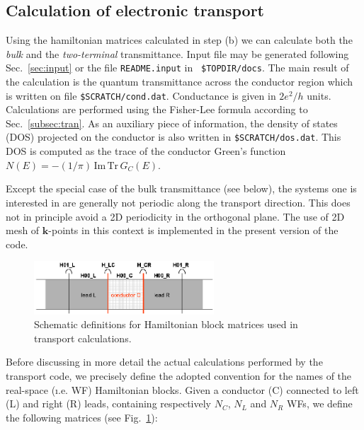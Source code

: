 
\subsection {Calculation of electronic transport}
\label{subsection:transport}

Using the hamiltonian matrices calculated in step (b) we can
calculate both the {\em bulk} and the {\em two-terminal}
transmittance. Input file may be generated following
Sec.~\ref{sec:input} or the file {\tt README.input} in {\tt
\$TOPDIR/docs}. The main result of the calculation is the quantum
transmittance across the conductor region which is written on file
{\tt \$SCRATCH/cond.dat}. Conductance is given in $2e^2/h$ units.
Calculations are performed using the Fisher-Lee formula according
to Sec.~\ref{subsec:tran}. As an auxiliary piece of information,
the density of states (DOS) projected on the conductor is also
written in {\tt \$SCRATCH/dos.dat}. This DOS is computed as the
trace of the conductor Green's function $ N(E) = -(1/\pi)\,
\text{Im} \, \text{Tr}\, G_C(E)$.

Except the special case of the bulk transmittance (see below), the systems one is
interested in are generally not periodic along the transport direction. This does not
in principle avoid a 2D periodicity in the orthogonal plane. The use of
2D mesh of $\mathbf{k}$-points in this context is implemented in the present
version of the code.  \\

%
%
\begin{figure}
   \centering
   \includegraphics[clip,width=0.6\textwidth]{lcr}
   \caption{Schematic definitions for Hamiltonian block matrices used in
        transport calculations. \label{fig:matrix_naming}}
\end{figure}
%
%
\noindent Before discussing in more detail the actual calculations
performed by the transport code, we precisely define the adopted
convention for the names of the real-space ({\i.e.} WF)
Hamiltonian blocks. Given a conductor (C) connected to left (L)
and right (R) leads, containing respectively $N_C$, $N_L$ and
$N_R$ WFs,
we define the following matrices (see Fig.~\ref{fig:matrix_naming}): \\

